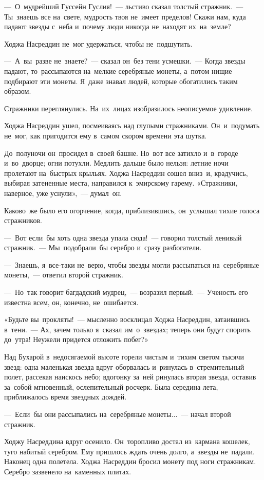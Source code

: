 \documentclass[12pt,a4paper]{book}
\begin{document}
—~О~мудрейший Гуссейн Гуслия!~— льстиво сказал толстый стражник.~— Ты~знаешь все на~свете, мудрость твоя не~имеет пределов! Скажи нам, куда падают звезды с~неба и~почему люди никогда не~находят их~на~земле?

Ходжа Насреддин не~мог удержаться, чтобы не~подшутить.

—~А~вы~разве не~знаете?~— сказал он~без тени усмешки.~— Когда звезды падают, то~рассыпаются на~мелкие серебряные монеты, а~потом нищие подбирают эти монеты. Я~даже знавал людей, которые обогатились таким образом.

Стражники переглянулись. На~их~лицах изобразилось неописуемое удивление.

Ходжа Насреддин ушел, посмеиваясь над глупыми стражниками. Он~и~подумать не~мог, как пригодится ему в~самом скором времени эта шутка.

До~полуночи он~просидел в~своей башне. Но~вот все затихло и~в~городе и~во~дворце; огни потухли. Медлить дальше было нельзя: летние ночи пролетают на~быстрых крыльях. Ходжа Насреддин сошел вниз~и, крадучись, выбирая затененные места, направился к~эмирскому гарему. «Стражники, наверное, уже уснули»,~— думал~он.

Каково~же было его огорчение, когда, приблизившись, он~услышал тихие голоса стражников.

—~Вот если~бы хоть одна звезда упала сюда!~— говорил толстый ленивый стражник.~— Мы~подобрали~бы серебро и~сразу разбогатели.

—~Знаешь, я~все-таки не~верю, чтобы звезды могли рассыпаться на~серебряные монеты,~— ответил второй стражник.

—~Но~так говорит багдадский мудрец,~— возразил первый.~— Ученость его известна всем, он, конечно, не~ошибается.

«Будьте вы~прокляты!~— мысленно восклицал Ходжа Насреддин, затаившись в~тени.~— Ах, зачем только я~сказал им~о~звездах; теперь они будут спорить до~утра! Неужели придется отложить побег?»

Над Бухарой в~недосягаемой высоте горели чистым и~тихим светом тысячи звезд: одна маленькая звезда вдруг оборвалась и~ринулась в~стремительный полет, рассекая наискось небо; вдогонку за~ней ринулась вторая звезда, оставив за~собой мгновенный, ослепительный росчерк. Была середина лета, приближалось время звездных дождей.

—~Если~бы они рассыпались на~серебряные монеты...~— начал второй стражник.

Ходжу Насреддина вдруг осенило. Он~торопливо достал из~кармана кошелек, туго набитый серебром. Ему пришлось ждать очень долго, а~звезды не~падали. Наконец одна полетела. Ходжа Насреддин бросил монету под ноги стражникам. Серебро зазвенело на~каменных плитах.
\end{document}
